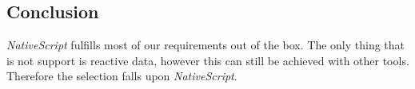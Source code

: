 \subsection*{Conclusion}
\textit{NativeScript} fulfills most of our requirements out of the box. 
The only thing that is not support is reactive data, however this can still be achieved with other tools.
Therefore the selection falls upon \textit{NativeScript}.
